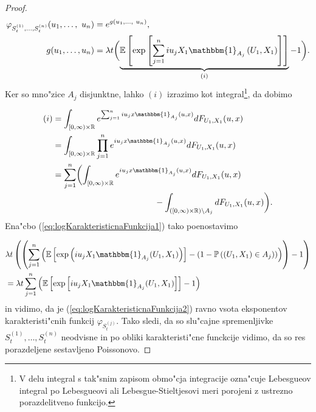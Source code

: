 \documentclass[12pt, a4paper, reqno]{amsart}
\theoremstyle{definition}
\theoremstyle{plain}
\newcommand{\R}{\mathbb{R}}
\newcommand{\E}{\mathbb{E}}
\newcommand{\Prob}{\mathbb{P}}
\newcommand{\1}{\mathds{1}}
\begin{document}
\begin{proof}
            \begin{align}
                    \varphi_{S_t^{(1)},\dots, S_t^{(n)}}(u_1, \dots, \ u_n) &= e^{g(u_1, \dots, \ u_n)}, \nonumber \\
                    g(u_1, \dots, u_n) &= \lambda t \biggl(\underbrace{\E\left[\exp\left[\sum_{j = 1}^niu_jX_1\mathbbm{1}_{A_j}\left(U_1, X_1\right)\right]\right]}_{(i)} - 1\biggr). \label{eq:logKarakteristicnaFunkcija1}
            \end{align}
            Ker so mno"zice $A_j$ disjunktne, lahko $(i)$ izrazimo kot integral\footnote{V delu 
            integral s tak"snim zapisom obmo"cja integracije ozna"cuje Lebesgueov integral po Lebesgueovi 
            ali Lebesgue-Stieltjesovi meri porojeni z ustrezno porazdelitveno funkcijo.}, da dobimo

            \begin{align*}
                (i) &= \int_{[0, \infty)\times\R}e^{\sum_{j = 1}^niu_jx\mathbbm{1}_{A_j}(u, x)}dF_{U_1, X_1}(u, x)\\
                    &= \int_{[0, \infty)\times\R}\prod_{j = 1}^ne^{iu_jx\mathbbm{1}_{A_j}(u, x)}dF_{U_1, X_1}(u, x)\\
                    &= \sum_{j=1}^n\biggl(\int_{[0, \infty)\times\R}e^{iu_jx\mathbbm{1}_{A_j}(u, x)}dF_{U_1, X_1}(u, x)  \\
                    & \qquad \qquad \qquad \qquad \qquad \qquad  - \int_{([0, \infty)\times\R) \setminus A_j}dF_{U_1, X_1}(u, x)\biggr).\\
            \end{align*}
            Ena"cbo (\ref{eq:logKarakteristicnaFunkcija1}) tako poenostavimo

            \begin{align}
                    &\lambda t \left(\left(\sum_{j=1}^n\left(\E\left[\exp\left(iu_j X_1 \mathbbm{1}_{A_j}(U_1, X_1)\right)\right] - \left( 1 - \Prob\left((U_1, X_1) \in A_j\right)\right)\right)\right) - 1\right)\nonumber \\
                    &= \lambda t \sum_{j=1}^n\left(\E\left[\exp\left[iu_jX_1\mathbbm{1}_{A_j}(U_1, X_1)\right]\right] - 1\right) \label{eq:logKarakteristicnaFunkcija2}
            \end{align} 
            in vidimo, da je (\ref{eq:logKarakteristicnaFunkcija2}) ravno vsota eksponentov karakteristi"cnih funkcij $\varphi_{S_t^{(j)}}$. 
            Tako sledi, da so slu"cajne spremenljivke $S_t^{(1)}, \dots, S_t^{(n)}$ neodvisne in po obliki karakteristi"cne 
            funckcije vidimo, da so res porazdeljene sestavljeno Poissonovo.
        \end{proof}
\end{document}
